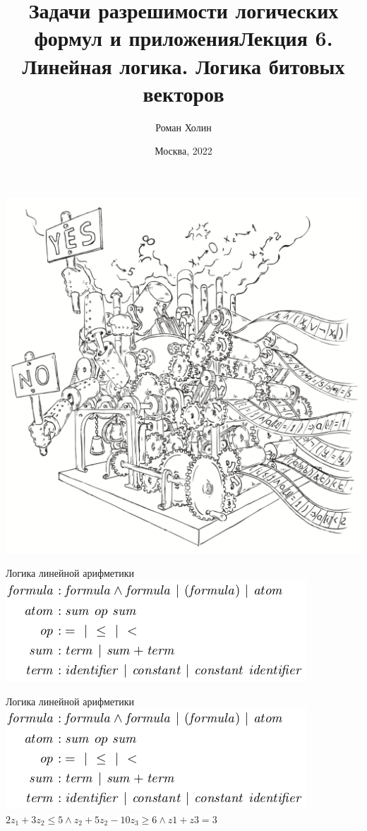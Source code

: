\documentclass{beamer}
\begin{document}
\title{Задачи разрешимости логических формул и приложения\newline Лекция 6. Линейная логика. Логика битовых векторов}
\author{Роман Холин}
\date{Москва, 2022}

\begin{frame}
\includegraphics[scale=0.5]{../decision-procedure.png}
\end{frame}

\frame{\titlepage}

\begin{frame}{Логика линейной арифметики}
\includegraphics[scale=0.5]{linear_syntax.png}
\end{frame}

\begin{frame}{Логика линейной арифметики}
\includegraphics[scale=0.5]{linear_syntax.png}
$2z_1 + 3z_2 \le 5 \wedge z_2 + 5z_2 - 10z_3 \ge 6 \wedge z1 + z3 = 3$
\end{frame}
\end{document}
